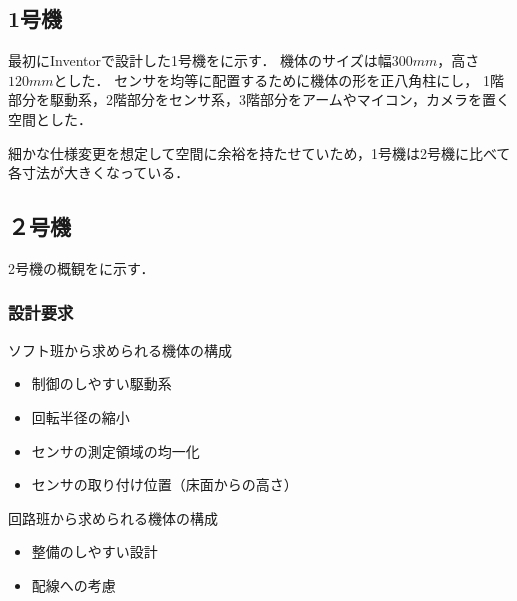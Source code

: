 \documentclass[11pt,a4]{jsarticle}
\begin{document}
  \subsection{1号機}
    最初にInventorで設計した1号機をに示す．
    機体のサイズは幅$300\unit{mm}$，高さ$120\unit{mm}$とした．
    センサを均等に配置するために機体の形を正八角柱にし，
    1階部分を駆動系，2階部分をセンサ系，3階部分をアームやマイコン，カメラを置く空間とした．

    細かな仕様変更を想定して空間に余裕を持たせていため，1号機は2号機に比べて各寸法が大きくなっている．


  \subsection{２号機}
    2号機の概観をに示す．

    \subsubsection{設計要求}
      ソフト班から求められる機体の構成
      \begin{itemize}
       \item 制御のしやすい駆動系
       \item 回転半径の縮小
       \item センサの測定領域の均一化
       \item センサの取り付け位置（床面からの高さ）
      \end{itemize}

      回路班から求められる機体の構成
      \begin{itemize}
       \item 整備のしやすい設計
       \item 配線への考慮
      \end{itemize}

\end{document}
